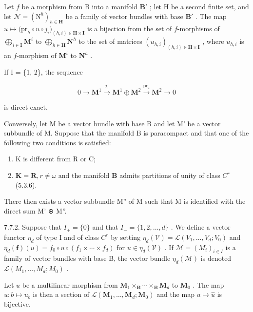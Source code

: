 Let \(f\) be a morphism from B into a manifold \(\mathbf{B}'\) ; let H be a second finite set, and let \(\mathcal{N} = (\mathrm{N}^{h})_{h\in \mathbf{H}}\) be a family of vector bundles with base \(\mathbf{B}'\) . The map \(u\mapsto \bigl(\mathrm{pr}_{h}\circ u\circ j_{i}\bigr)_{(h,i)\in \mathbf{H}\times \mathbf{I}}\) is a bijection from the set of \(f\)-morphisms of \(\bigoplus_{i\in \mathbf{I}}\mathbf{M}^i\) to \(\bigoplus_{h\in \mathbf{H}}\mathbf{N}^h\) to the set of matrices \((u_{h,i})_{(h,i)\in \mathbf{H}\times \mathbf{I}}\) , where \(u_{h,i}\) is an \(f\)-morphism of \(\mathbf{M}^i\) to \(\mathbf{N}^h\) .

If I = \{1, 2\}, the sequence

\[
0 \to \mathbf {M}^{1} \xrightarrow{j_{1}} \mathbf {M}^{1} \oplus \mathbf {M}^{2} \stackrel{\mathrm{pr}_{2}}{\to} \mathbf {M}^{2} \to 0
\]

is direct exact.

Conversely, let M be a vector bundle with base B and let M' be a vector subbundle of M. Suppose that the manifold B is paracompact and that one of the following two conditions is satisfied:

\begin{enumerate}
\def\labelenumi{(\roman{enumi})}
\item
  K is different from R or C;
\item
  \(\mathbf{K} = \mathbf{R}, r \neq \omega\) and the manifold \(\mathbf{B}\) admits partitions of unity of class \(C^r\) (5.3.6).
\end{enumerate}

There then exists a vector subbundle M'' of M such that M is identified with the direct sum M' ⊕ M''.

7.7.2. Suppose that \(I_{+}=\{0\}\) and that \(I_{-}=\{1,2,\ldots,d\}\) . We define a vector functor \(\eta_{d}\) of type I and of class \(C^{r}\) by setting \(\eta_{d}(\mathcal{V})=\mathcal{L}(V_{1},\ldots,V_{d};V_{0})\) and \(\eta_{d}(\mathbf{f})(u)=f_{0}\circ u\circ(f_{1}\times\cdots\times f_{d})\) for \(u\in\eta_{d}(\mathcal{V})\) . If \(\mathcal{M}=(M_{i})_{i\in I}\) is a family of vector bundles with base B, the vector bundle \(\eta_{d}(\mathcal{M})\) is denoted \(\mathcal{L}(M_{1},\ldots,M_{d};M_{0})\) .

Let \(u\) be a multilinear morphism from \(\mathbf{M}_{1} \times_{\mathbf{B}} \cdots \times_{\mathbf{B}} \mathbf{M}_{d}\) to \(\mathbf{M}_{0}\) . The map \(\hat{u}: b \mapsto u_{b}\) is then a section of \(\mathcal{L}(\mathbf{M}_{1}, \ldots, \mathbf{M}_{d}; \mathbf{M}_{0})\) and the map \(u \mapsto \hat{u}\) is bijective.

